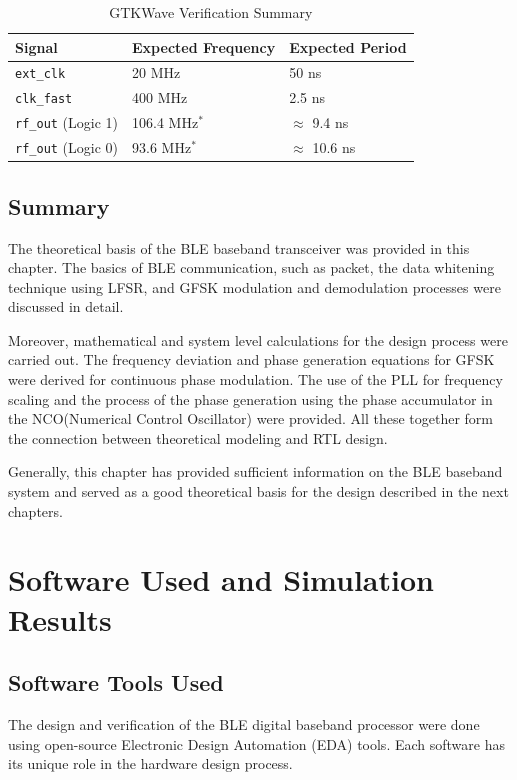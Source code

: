 \documentclass[12pt,singleside,a4paper]{report}
\begin{document}
\begin{table}[h]
\centering
\caption{GTKWave Verification Summary}
\vspace{0.5em}
\begin{tabular}{@{}lll@{}}
\toprule
\textbf{Signal} & \textbf{Expected Frequency} & \textbf{Expected Period} \\ \midrule
\texttt{ext\_clk}   & 20 MHz                & 50 ns \\
\texttt{clk\_fast}  & 400 MHz               & 2.5 ns \\
\texttt{rf\_out} (Logic 1) & 106.4 MHz$^*$  & $\approx$ 9.4 ns \\
\texttt{rf\_out} (Logic 0) & 93.6 MHz$^*$   & $\approx$ 10.6 ns \\ \bottomrule
\end{tabular}
\end{table}
\section{Summary}

The theoretical basis of the BLE baseband transceiver was provided in this chapter. The basics of BLE communication, such as packet, the data whitening technique using LFSR, and GFSK modulation and demodulation processes were discussed in detail.

Moreover, mathematical and system level calculations for the design process were carried out. The frequency deviation and phase generation equations for GFSK were derived for continuous phase modulation. The use of the PLL for frequency scaling and the process of the phase generation using the phase accumulator in the NCO(Numerical Control Oscillator) were provided. All these together form the connection between theoretical modeling and RTL design.

Generally, this chapter has provided sufficient information on the BLE baseband system and served as a good theoretical basis for the design described in the next chapters.



\chapter{Software Used and Simulation Results}

\section{Software Tools Used}
The design and verification of the BLE digital baseband processor were done using open-source Electronic Design Automation (EDA) tools. Each software has its unique role in the hardware design process.
\end{document}

